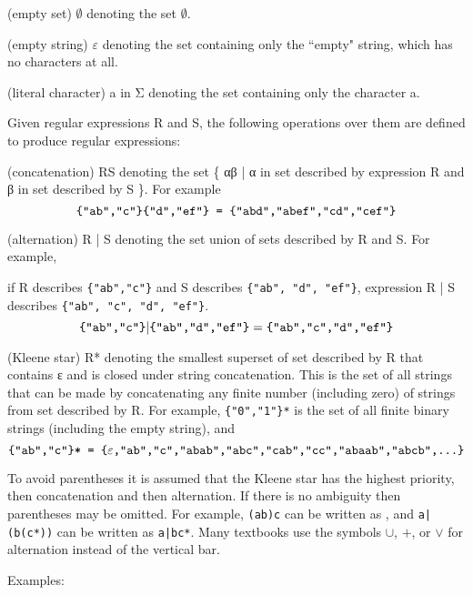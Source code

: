 \begin{compactitem}
\item (\textsf{empty set}) $\emptyset$ denoting the set $\emptyset$.
\item (\textsf{empty string}) $\varepsilon$ denoting the set containing only the ``empty" string, which has no characters at all.
\item (\textsf{literal character}) a in Σ denoting the set containing only the character a.
\end{compactitem}


Given regular expressions R and S, the following operations over them are defined to produce regular expressions:

\begin{compactitem}
\item (\textsf{concatenation}) RS denoting the set \{ αβ | α in set described by expression R and β in set described by S \}. For example $$\text{\texttt{\{"ab","c"\}\{"d","ef"\} = \{"abd","abef","cd","cef"\}}}$$
\item (\textsf{alternation}) R | S denoting the set union of sets described by R and S. For example, 

if R describes \texttt{\{"ab","c"\}} and S describes \texttt{\{"ab", "d", "ef"\}}, expression R | S describes \texttt{\{"ab", "c", "d", "ef"\}}.$$\text{\texttt{\{"ab","c"\}}|\texttt{\{"ab","d","ef"\}}}=\texttt{\{"ab","c","d","ef"\}}$$
\item (\textsf{Kleene star}) R* denoting the smallest superset of set described by R that contains ε and is closed under string concatenation. This is the set of all strings that can be made by concatenating any finite number (including zero) of strings from set described by R. For example, \texttt{\{"0","1"\}*} is the set of all finite binary strings (including the empty string), and 
$$\text{\texttt{\{"ab","c"\}* = \{}} \varepsilon \text{\texttt{,"ab","c","abab","abc","cab","cc","abaab","abcb",...\}}}$$
\end{compactitem}

To avoid parentheses it is assumed that the Kleene star has the highest priority, then concatenation and then alternation. If there is no ambiguity then parentheses may be omitted. For example, \texttt{(ab)c} can be written as , and \texttt{a|(b(c*))} can be written as \texttt{a|bc*}. Many textbooks use the symbols $\cup$, $+$, or $\vee$ for alternation instead of the vertical bar.

Examples:

